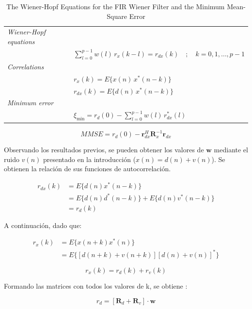 \documentclass[a4paper]{article}
\begin{document}
\begin{table}[H]
	\centering
	\caption{The Wiener-Hopf Equations for the FIR Wiener Filter and the Minimum Mean-Square Error}
	\begin{tabular}{ll}
		\toprule
		\textit{Wiener-Hopf equations} & \\
		& $\displaystyle \sum_{l=0}^{p-1} w(l)\,r_x(k - l) = r_{dx}(k) \quad ; \quad k = 0, 1, \dots, p-1$ \\[12pt]
		\textit{Correlations} & \\
		& $r_x(k) = E\{x(n)\,x^*(n - k)\}$ \\
		& $r_{dx}(k) = E\{d(n)\,x^*(n - k)\}$ \\[10pt]
		\textit{Minimum error} & \\
		& $\displaystyle \xi_{\min} = r_d(0) - \sum_{l=0}^{p-1} w(l)\,r_{dx}^*(l)$ \\[10pt]
		\bottomrule
	\end{tabular}
\end{table}

\begin{equation}
	\boxed{MMSE  = r_d(0) - \mathbf{r}_{dx}^H \mathbf{R}_x^{-1} \mathbf{r}_{dx}}
\end{equation}


Observando los resultados previos, se pueden obtener los valores de $\mathbf{w}$ mediante el ruido $v(n)$ presentado en la introducción ($x(n) = d(n) + v(n)$). Se obtienen la relación de sus funciones de autocorrelación.


\begin{align}
	r_{dx}(k) &= E\{d(n)x^*(n-k)\} \nonumber \\
	&= E\{d(n)d^*(n-k)\} + E\{d(n)v^*(n-k)\} \nonumber \\
	&= r_d(k)
\end{align}

A continuación, dado que:

\begin{align}
	r_x(k) &= E\{x(n+k)x^*(n)\} \nonumber \\
	&= E\bigl\{[d(n+k) + v(n+k)][d(n) + v(n)]^*\bigr\}
\end{align}

\begin{equation}
	r_x(k) = r_d(k) + r_v(k)
\end{equation}

Formando las matrices con todos los valores de k, se obtiene :

\begin{equation}
	\boxed{ r_d = [\mathbf{R}_d +  \mathbf{R}_v] \cdot \mathbf{w} }
\end{equation}
\end{document}

